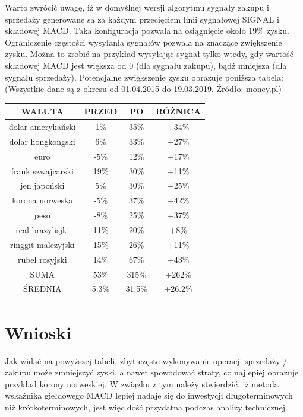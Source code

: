 \documentclass{article} %
\begin{document}
Warto zwrócić uwagę, iż w domyślnej wersji algorytmu sygnały zakupu i sprzedaży generowane są za każdym przecięciem 
linii sygnałowej SIGNAL i składowej MACD.
Taka konfiguracja pozwala na osiągnięcie około 19\% zysku. \\
Ograniczenie częstości wysyłania sygnałów pozwala na znaczące zwiększenie zysku. Można to zrobić na przykład wysyłając sygnał
tylko wtedy, gdy wartość składowej MACD jest większa od 0 (dla sygnału zakupu), 
bądź mniejsza (dla sygnału sprzedaży). Potencjalne zwiększenie zysku obrazuje poniższa tabela: (Wszystkie dane są z okresu od 01.04.2015 do 19.03.2019. Źródło: money.pl) \\
\begin{center} 
    \begin{tabular}  { | c || c | c || c |  }
        \hline
        WALUTA & PRZED & PO & RÓŻNICA \\
        \hline
        \hline
        dolar amerykański & 1\% & 35\% & +34\% \\
        \hline
        dolar hongkongski & 6\% & 33\% & +27\% \\
        \hline
        euro & -5\% & 12\% & +17\% \\
        \hline
        frank szwajcarski & 19\% & 30\% & +11\% \\
        \hline
        jen japoński & 5\% & 30\% & +25\% \\
        \hline
        korona norweska & -5\% & 37\% & +42\% \\
        \hline
        peso & -8\% & 25\% & +37\% \\
        \hline 
        real brazylisjki & 11\% & 20\% & +8\% \\
        \hline
        ringgit malezyjski & 15\% & 26\% & +11\% \\
        \hline 
        rubel rosyjski & 14\% & 67\% & +43\% \\
        \hline
        \hline
        SUMA & 53\% & 315\% & +262\% \\
        \hline
        ŚREDNIA & 5.3\% & 31.5\% & +26.2\% \\
        \hline
    \end{tabular}
\end{center}
\newpage
\section{Wnioski}
Jak widać na powyższej tabeli, zbyt częste wykonywanie operacji sprzedaży / zakupu może zmniejszyć zyski,
 a nawet spowodować straty, co najlepiej obrazuje przykład korony norweskiej. W związku z tym należy stwierdzić,
  iż metoda wskaźnika giełdowego MACD lepiej nadaje się do inwestycji długoterminowych niż krótkoterminowych, 
  jest więc dość przydatna podczas analizy technicznej.
\end{document}
